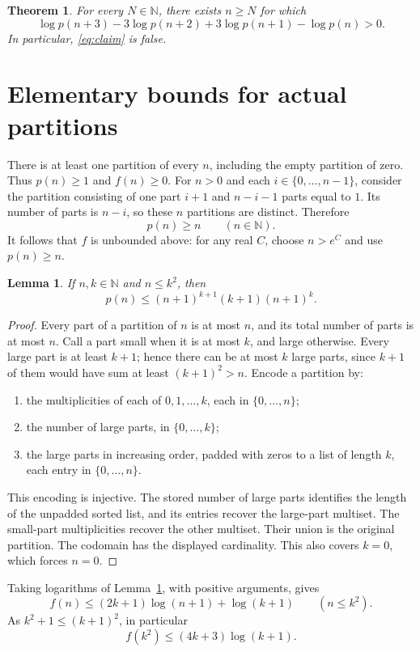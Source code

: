 \documentclass[11pt]{article}
\newtheorem{theorem}{Theorem}
\newtheorem{lemma}{Lemma}
\newcommand{\N}{\mathbb N}
\begin{document}
\begin{theorem}\label{thm:main}
For every $N\in\N$, there exists $n\ge N$ for which
\[
\log p(n+3)-3\log p(n+2)+3\log p(n+1)-\log p(n)>0.
\]
In particular, \eqref{eq:claim} is false.
\end{theorem}

\section{Elementary bounds for actual partitions}
There is at least one partition of every $n$, including the empty partition of zero. Thus $p(n)\ge1$ and $f(n)\ge0$.
For $n>0$ and each $i\in\{0,\ldots,n-1\}$, consider the partition consisting of one part $i+1$ and $n-i-1$ parts equal to $1$. Its number of parts is $n-i$, so these $n$ partitions are distinct. Therefore
\begin{equation}\label{eq:lower}
p(n)\ge n\qquad(n\in\N).
\end{equation}
It follows that $f$ is unbounded above: for any real $C$, choose $n>e^C$ and use $p(n)\ge n$.

\begin{lemma}\label{lem:count}
If $n,k\in\N$ and $n\le k^2$, then
\[
p(n)\le(n+1)^{k+1}(k+1)(n+1)^k.
\]
\end{lemma}
\begin{proof}
Every part of a partition of $n$ is at most $n$, and its total number of parts is at most $n$. Call a part small when it is at most $k$, and large otherwise.
Every large part is at least $k+1$; hence there can be at most $k$ large parts, since $k+1$ of them would have sum at least $(k+1)^2>n$.
Encode a partition by:
\begin{enumerate}
\item the multiplicities of each of $0,1,\ldots,k$, each in $\{0,\ldots,n\}$;
\item the number of large parts, in $\{0,\ldots,k\}$;
\item the large parts in increasing order, padded with zeros to a list of length $k$, each entry in $\{0,\ldots,n\}$.
\end{enumerate}
This encoding is injective. The stored number of large parts identifies the length of the unpadded sorted list, and its entries recover the large-part multiset. The small-part multiplicities recover the other multiset. Their union is the original partition. The codomain has the displayed cardinality. This also covers $k=0$, which forces $n=0$.
\end{proof}
Taking logarithms of Lemma~\ref{lem:count}, with positive arguments, gives
\begin{equation}\label{eq:logbound}
f(n)\le(2k+1)\log(n+1)+\log(k+1)\qquad(n\le k^2).
\end{equation}
As $k^2+1\le(k+1)^2$, in particular
\begin{equation}\label{eq:square}
f(k^2)\le(4k+3)\log(k+1).
\end{equation}
\end{document}
